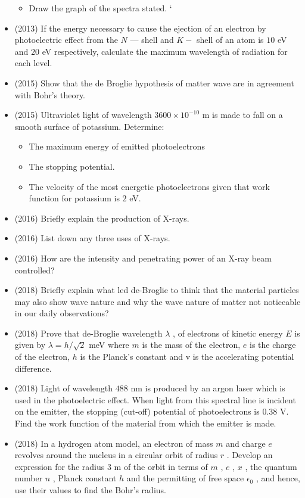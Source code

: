 \documentclass{article}
\begin{document}
\begin{itemize}
\begin{itemize}
\item Draw the graph of the spectra stated. ‘
\end{itemize}
\item (2013)  If the energy necessary to cause the ejection of an electron by photoelectric effect from the $ N$ — shell and $ K-$ shell of an atom is $ 10$ eV and $ 20$ eV respectively, calculate the maximum wavelength of radiation for each level.
\item (2015)  Show that the de Broglie hypothesis of matter wave are in agreement with Bohr’s theory.
\item (2015)  Ultraviolet light of wavelength $ 3600 \times 10^{-10}$ m is made to fall on a smooth surface of potassium. Determine:\begin{itemize}
\item The maximum energy of emitted photoelectrons
\item The stopping potential.
\item The velocity of the most energetic photoelectrons given that work function for potassium is $ 2$ eV.
\end{itemize}
\item (2016)  Briefly explain the production of X-rays.
\item (2016)  List down any three uses of X-rays.
\item (2016)  How are the intensity and penetrating power of an X-ray beam controlled?
\item (2018)  Briefly explain what led de-Broglie to think that the material particles may also show wave nature and why the wave nature of matter not noticeable in our daily observations? 
\item (2018)  Prove that de-Broglie wavelength $ \lambda $ , of electrons of kinetic energy $ E$ is given by $ \lambda = h/ \sqrt{2}$ meV  where $ m$ is the mass of the electron, $ e$ is the charge of the electron, $ h$ is the Planck’s constant and v is the accelerating potential difference. 
\item (2018)  Light of wavelength $ 488$ nm is produced by an argon laser which is used in the photoelectric effect. When light from this spectral line is incident on the emitter, the stopping (cut-off) potential of photoelectrons is $ 0.38$ V. Find the work function of the material from which the emitter is made. 
\item (2018)  In a hydrogen atom model, an electron of mass $ m$ and charge $ e$ revolves around the nucleus in a circular orbit of radius $ r$ . Develop an expression for the radius $ 3$ m of the orbit in terms of $ m$ , $ e$ , $ x$ , the quantum number $ n$ , Planck constant $ h$ and the permitting of free space $ \epsilon _{0}$ , and hence, use their values to find the Bohr’s radius. 

\end{itemize}
\end{document}
